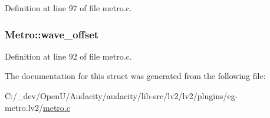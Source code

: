 Definition at line 97 of file metro.\+c.

\subsubsection[{\texorpdfstring{wave\+\_\+offset}{wave_offset}}]{ Metro\+::wave\+\_\+offset}\hypertarget{struct_metro_a53078e04d9ead20fb23a24f48d9f5139}{}\label{struct_metro_a53078e04d9ead20fb23a24f48d9f5139}


Definition at line 92 of file metro.\+c.



The documentation for this struct was generated from the following file\+:\begin{DoxyCompactItemize}
\item 
C\+:/\+\_\+dev/\+Open\+U/\+Audacity/audacity/lib-\/src/lv2/lv2/plugins/eg-\/metro.\+lv2/\hyperlink{metro_8c}{metro.\+c}\end{DoxyCompactItemize}
